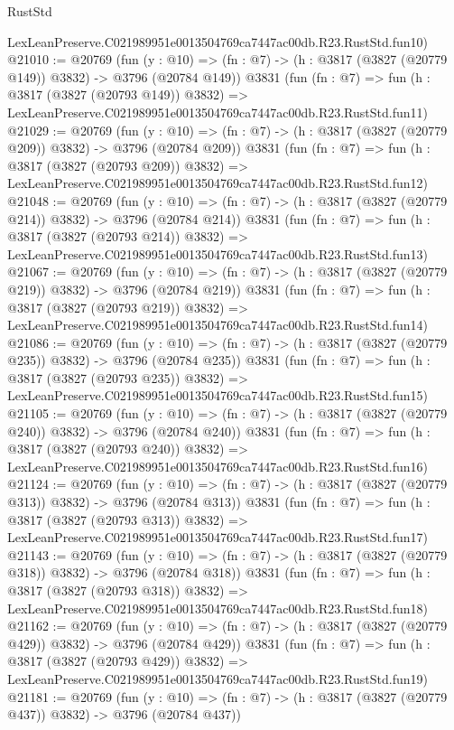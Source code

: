 \begin{lexlean}{RustStd}
\begin{coremodule}
    LexLeanPreserve.C021989951e0013504769ca7447ac00db.R23.RustStd.fun10)
@21010 := @20769
    (fun (y : @10) => (fn : @7) -> (h : @3817 (@3827 (@20779 @149)) @3832) -> @3796 (@20784 @149))
    @3831
    (fun (fn : @7) =>
    fun (h : @3817 (@3827 (@20793 @149)) @3832) =>
    LexLeanPreserve.C021989951e0013504769ca7447ac00db.R23.RustStd.fun11)
@21029 := @20769
    (fun (y : @10) => (fn : @7) -> (h : @3817 (@3827 (@20779 @209)) @3832) -> @3796 (@20784 @209))
    @3831
    (fun (fn : @7) =>
    fun (h : @3817 (@3827 (@20793 @209)) @3832) =>
    LexLeanPreserve.C021989951e0013504769ca7447ac00db.R23.RustStd.fun12)
@21048 := @20769
    (fun (y : @10) => (fn : @7) -> (h : @3817 (@3827 (@20779 @214)) @3832) -> @3796 (@20784 @214))
    @3831
    (fun (fn : @7) =>
    fun (h : @3817 (@3827 (@20793 @214)) @3832) =>
    LexLeanPreserve.C021989951e0013504769ca7447ac00db.R23.RustStd.fun13)
@21067 := @20769
    (fun (y : @10) => (fn : @7) -> (h : @3817 (@3827 (@20779 @219)) @3832) -> @3796 (@20784 @219))
    @3831
    (fun (fn : @7) =>
    fun (h : @3817 (@3827 (@20793 @219)) @3832) =>
    LexLeanPreserve.C021989951e0013504769ca7447ac00db.R23.RustStd.fun14)
@21086 := @20769
    (fun (y : @10) => (fn : @7) -> (h : @3817 (@3827 (@20779 @235)) @3832) -> @3796 (@20784 @235))
    @3831
    (fun (fn : @7) =>
    fun (h : @3817 (@3827 (@20793 @235)) @3832) =>
    LexLeanPreserve.C021989951e0013504769ca7447ac00db.R23.RustStd.fun15)
@21105 := @20769
    (fun (y : @10) => (fn : @7) -> (h : @3817 (@3827 (@20779 @240)) @3832) -> @3796 (@20784 @240))
    @3831
    (fun (fn : @7) =>
    fun (h : @3817 (@3827 (@20793 @240)) @3832) =>
    LexLeanPreserve.C021989951e0013504769ca7447ac00db.R23.RustStd.fun16)
@21124 := @20769
    (fun (y : @10) => (fn : @7) -> (h : @3817 (@3827 (@20779 @313)) @3832) -> @3796 (@20784 @313))
    @3831
    (fun (fn : @7) =>
    fun (h : @3817 (@3827 (@20793 @313)) @3832) =>
    LexLeanPreserve.C021989951e0013504769ca7447ac00db.R23.RustStd.fun17)
@21143 := @20769
    (fun (y : @10) => (fn : @7) -> (h : @3817 (@3827 (@20779 @318)) @3832) -> @3796 (@20784 @318))
    @3831
    (fun (fn : @7) =>
    fun (h : @3817 (@3827 (@20793 @318)) @3832) =>
    LexLeanPreserve.C021989951e0013504769ca7447ac00db.R23.RustStd.fun18)
@21162 := @20769
    (fun (y : @10) => (fn : @7) -> (h : @3817 (@3827 (@20779 @429)) @3832) -> @3796 (@20784 @429))
    @3831
    (fun (fn : @7) =>
    fun (h : @3817 (@3827 (@20793 @429)) @3832) =>
    LexLeanPreserve.C021989951e0013504769ca7447ac00db.R23.RustStd.fun19)
@21181 := @20769
    (fun (y : @10) => (fn : @7) -> (h : @3817 (@3827 (@20779 @437)) @3832) -> @3796 (@20784 @437))

\end{coremodule}
\end{lexlean}
